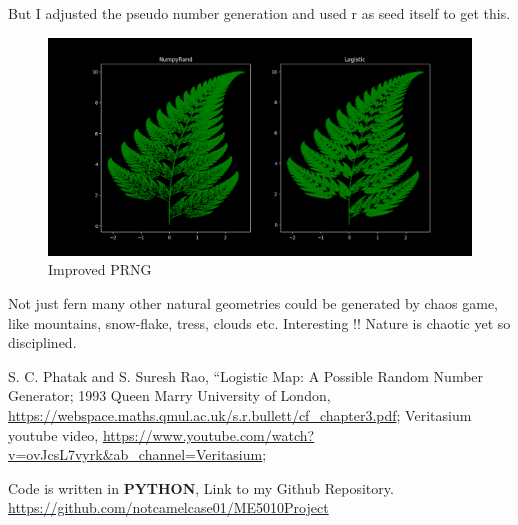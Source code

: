 \documentclass{report}
\begin{document}
But I adjusted the pseudo number generation and used r as seed itself to get this.

\begin{figure}[!h]
    \centering
    \includegraphics[scale=.3]{images/goodfern.png}
    \caption{Improved PRNG}
    \label{fig:my_label14}
\end{figure}
Not just fern many other natural geometries could be generated by chaos game, like mountains, snow-flake, tress, clouds etc. Interesting !!
Nature is chaotic yet so disciplined.
\newpage
\begin{thebibliography}{1}
	    S. C. Phatak and  S. Suresh Rao,
		``Logistic Map: A Possible Random Number
Generator;
		1993
		Queen Marry University of London,
		\url{https://webspace.maths.qmul.ac.uk/s.r.bullett/cf_chapter3.pdf};
		Veritasium youtube video,
		\url{https://www.youtube.com/watch?v=ovJcsL7vyrk&ab_channel=Veritasium};

	    Code is written in \textbf{PYTHON}, Link to my Github Repository.  \url{https://github.com/notcamelcase01/ME5010Project}
\end{thebibliography}
\end{document}
